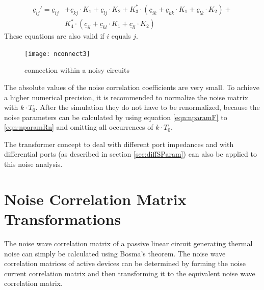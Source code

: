 \documentclass[10pt]{report}
\begin{document}
\begin{equation}
\begin{split}
\underline{c}_{ij}' = \underline{c}_{ij} &+ \underline{c}_{kj}\cdot K_1 + \underline{c}_{lj}\cdot K_2
   + K_3^*\cdot(\underline{c}_{ik} + \underline{c}_{kk}\cdot K_1 + \underline{c}_{lk}\cdot K_2) + \\
    &K_4^*\cdot(\underline{c}_{il} + \underline{c}_{kl}\cdot K_1 + \underline{c}_{ll}\cdot K_2)
\end{split}
\end{equation}
These equations are also valid if $i$ equals $j$.

\begin{figure}[ht]
\begin{center}
\texttt{[image: nconnect3]}
\end{center}
\caption{connection within a noisy circuits}
\label{fig:nconnect3}
\end{figure}
\FloatBarrier

The absolute values of the noise correlation coefficients are very
small.  To achieve a higher numerical precision, it is recommended to
normalize the noise matrix with $k\cdot T_0$. After the simulation
they do not have to be renormalized, because the noise parameters can
be calculated by using equation \eqref{eqn:nparamF} to
\eqref{eqn:nparamRn} and omitting all occurrences of $k\cdot T_0$.

\addvspace{12pt}

The transformer concept to deal with different port impedances and
with differential ports (as described in section \ref{sec:diffSParam})
can also be applied to this noise analysis.


\section{Noise Correlation Matrix Transformations}

The noise wave correlation matrix of a passive linear circuit
generating thermal noise can simply be calculated using Bosma's theorem.
The noise wave correlation matrices of active devices can be
determined by forming the noise current correlation matrix and then
transforming it to the equivalent noise wave correlation matrix.

\addvspace{12pt}
\end{document}
